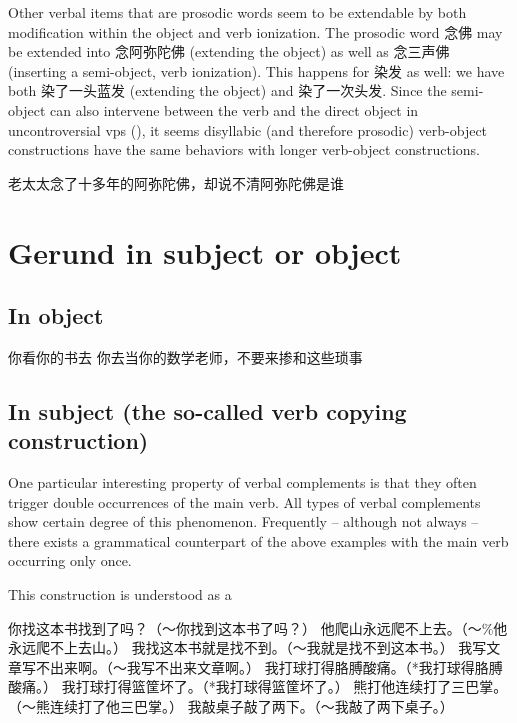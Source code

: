 \documentclass[UTF8, a4paper, oneside, scheme=plain, 12pt]{ctexrep}
\begin{document}
Other verbal items that are prosodic words
seem to be extendable by 
both modification within the object 
and verb ionization.
The prosodic word 念佛 may be extended into 念阿弥陀佛 (extending the object)
as well as 念三声佛 (inserting a semi-object, verb ionization).
This happens for 染发 as well: 
we have both 染了一头蓝发 (extending the object) 
and 染了一次头发.
Since the semi-object can also intervene
between the verb and the direct object in uncontroversial \acs{vp}s 
(), 
it seems disyllabic (and therefore prosodic) verb-object constructions 
have the same behaviors with 
longer verb-object constructions.

\begin{exe}
    \ex\label{ex:verb-phrase.separation.nianfo-full-vp} 老太太念了十多年的阿弥陀佛，却说不清阿弥陀佛是谁
\end{exe}



\section{Gerund in subject or object}

\subsection{In object}

\begin{exe}
    \ex 你看你的书去
    \ex 你去当你的数学老师，不要来掺和这些琐事
\end{exe}

\subsection{In subject (the so-called verb copying construction)}

One particular interesting property of verbal complements is 
that they often trigger double occurrences of the main verb. 
All types of verbal complements show certain degree of this phenomenon.
Frequently -- although not always -- 
there exists a grammatical counterpart of the above examples with the main verb occurring only once.

This construction is understood as a 

\begin{exe}
    \ex 你找这本书找到了吗？（～你找到这本书了吗？）
    \ex 他爬山永远爬不上去。（～\%他永远爬不上去山。）
    \ex 我找这本书就是找不到。（～我就是找不到这本书。）
    \ex 我写文章写不出来啊。（～我写不出来文章啊。）
    \ex 我打球打得胳膊酸痛。（*我打球得胳膊酸痛。）
    \ex 我打球打得篮筐坏了。（*我打球得篮筐坏了。）
    \ex 熊打他连续打了三巴掌。（～熊连续打了他三巴掌。）
    \ex 我敲桌子敲了两下。（～我敲了两下桌子。）
\end{exe}
\end{document}
